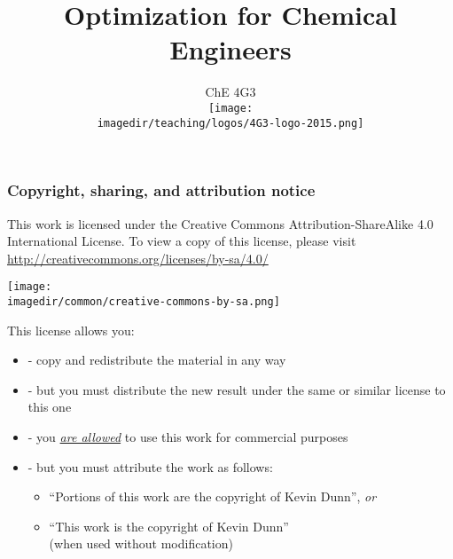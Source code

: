 \documentclass[handout, 11pt]{beamer}
\title[]{\Large Optimization for Chemical Engineers}
\subtitle[]{\Large ChE 4G3 \\ \vspace{0.5cm} \texttt{[image: \\imagedir/teaching/logos/4G3-logo-2015.png]} \vspace{-1.5cm} }
\author[]{}
\institute[]{}
\date[]{\copyright~ Kevin Dunn, \today \\ \vspace{1cm}{\footnotesize {\tt kevin.dunn@mcmaster.ca}\\ \href{http://learnche.mcmaster.ca/4G3}{http://learnche.mcmaster.ca/4G3}\\ \vspace{1cm}}

{\footnotesize Revision: \hgversion (\monthname~\THEYEAR)} %
}
\begin{document}
	
\begin{frame} \titlepage \end{frame}

\begin{frame}\frametitle{Copyright, sharing, and attribution notice}

	{\footnotesize This work is licensed under the Creative Commons Attribution-ShareAlike 4.0 International License. To view a copy of this license, 
	please visit \href{http://creativecommons.org/licenses/by-sa/4.0/}{http://creativecommons.org/licenses/by-sa/4.0/}}
	\vspace{-1.0cm}
	\begin{flushright}
		\texttt{[image: \\imagedir/common/creative-commons-by-sa.png]}
		
	\end{flushright}	
	\vspace{-0.2cm}
	\begin{exampleblock}{}
		{\small This license allows you: }
		\begin{itemize}
			\item	{} - copy and redistribute the material in any way
			\item	{} - but you must distribute the new result under the same or similar license to this one
			\item	{} - you \underline{\emph{are allowed}} to use this work for commercial purposes 
			\item	{} - but you must attribute the work as follows:
			\begin{itemize}
				\item	``Portions of this work are the copyright of Kevin Dunn'', \emph{or}
				\item	``This work is the copyright of Kevin Dunn'' \\{\tiny (when used without modification)}
			\end{itemize} 
		\end{itemize}
	\end{exampleblock}
\end{frame}
\end{document}
